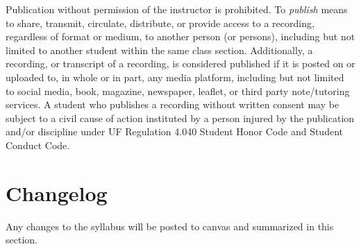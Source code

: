 \documentclass[11pt, article, oneside]{memoir}
\begin{document}
Publication without permission of the instructor is prohibited. To \emph{publish} means to share, transmit, circulate, distribute, or provide access to a recording, regardless of format or medium, to another person (or persons), including but not limited to another student within the same class section. Additionally, a recording, or transcript of a recording, is considered published if it is posted on or uploaded to, in whole or in part, any media platform, including but not limited to social media, book, magazine, newspaper, leaflet, or third party note/tutoring services. A student who publishes a recording without written consent may be subject to a civil cause of action instituted by a person injured by the publication and/or discipline under UF Regulation 4.040 Student Honor Code and Student Conduct Code.

\section{Changelog}
Any changes to the syllabus will be posted to canvas and summarized in this section.
\end{document}
